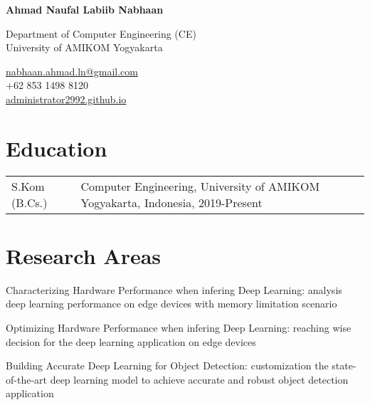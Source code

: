 \documentclass[12pt,letterpaper]{report}
\newcommand{\myname}{Ahmad Naufal Labiib Nabhaan}
\newcommand{\namefont}[1]{{\normalfont\bfseries\Huge{#1}}}
\newcommand{\listitemspace}{0.25em}
\renewenvironment{itemize}
{\begin{list}{}{\setlength{\leftmargin}{0em}
                \setlength{\parskip}{0em}
                \setlength{\itemsep}{\listitemspace}
                \setlength{\parsep}{\listitemspace}}}
{\end{list}}
\begin{document}
    \raggedright{}

    \namefont{\myname}

    \vspace{1em}
    \begin{minipage}[t]{0.700\textwidth}
        Department of Computer Engineering (CE)\\
        University of AMIKOM Yogyakarta
    \end{minipage}
    \begin{minipage}[t]{0.295\textwidth}
        \flushright{}
        \href{mailto:nabhaan.ahmad.ln@gmail.com}{nabhaan.ahmad.ln@gmail.com} \\
        +62 853 1498 8120 \\
        \href{https://administrator2992.github.io}{administrator2992.github.io}
    \end{minipage}

    \section*{Education}

    \begin{tabular}{@{}p{}p{}}
        S.Kom (B.Cs.) & Computer Engineering, University of AMIKOM Yogyakarta, Indonesia, 2019-Present \\
    \end{tabular}
    
    \section*{Research Areas}
    \begin{itemize}
      \item Characterizing Hardware Performance when infering Deep Learning: analysis deep learning performance on edge devices with memory limitation scenario
      \item Optimizing Hardware Performance when infering Deep Learning: reaching wise decision for the deep learning application on edge devices
      \item Building Accurate Deep Learning for Object Detection: customization the state-of-the-art deep learning model to achieve accurate and robust object detection application
    \end{itemize}
    
\end{document}
